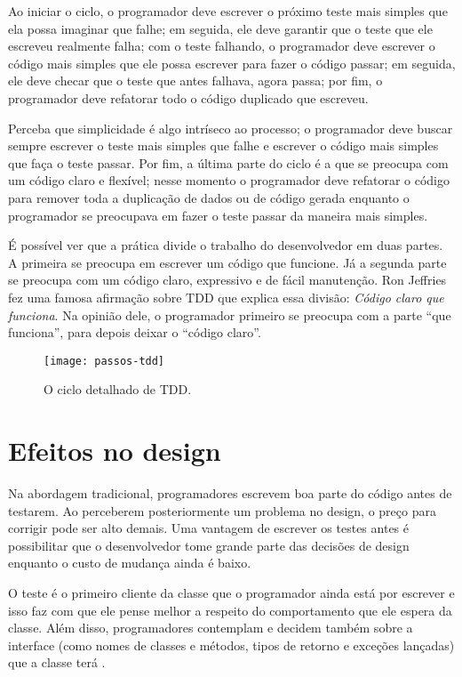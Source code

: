 Ao iniciar o ciclo, o programador deve escrever o próximo teste mais simples que
ela possa imaginar que falhe; em seguida, ele deve garantir que o teste que ele
escreveu realmente falha; com o teste falhando, o programador deve escrever o
código mais simples que ele possa escrever para fazer o código passar; em
seguida, ele deve checar que o teste que antes falhava, agora passa; por fim, o
programador deve refatorar todo o código duplicado que escreveu.

Perceba que simplicidade é algo intríseco ao processo; o programador deve buscar
sempre escrever o teste mais simples que falhe e escrever o código mais simples
que faça o teste passar. Por fim, a última parte do ciclo é a que se preocupa
com um código claro e flexível; nesse momento o programador deve refatorar o
código para remover toda a duplicação de dados ou de código gerada enquanto o
programador se preocupava em fazer o teste passar da maneira mais simples.

É possível ver que a prática divide o trabalho do desenvolvedor em duas partes.
A primeira se preocupa em escrever um código que funcione. Já a segunda parte
se preocupa com um código claro, expressivo e de fácil manutenção. Ron Jeffries
fez uma famosa afirmação sobre TDD que explica essa divisão: \textit{Código
claro que funciona}. Na opinião dele, o programador primeiro se preocupa com a
parte ``que funciona'', para depois deixar o ``código claro''.

\begin{figure}
  \centering
  \texttt{[image: passos-tdd]}
  \caption{O ciclo detalhado de TDD.}
  \label{fig:passos-tdd}
\end{figure}

\section{Efeitos no design}

Na abordagem tradicional, programadores escrevem boa parte do código antes de
testarem. Ao perceberem posteriormente um problema no design, o preço para
corrigir pode ser alto demais. Uma vantagem de escrever os testes antes é
possibilitar que o desenvolvedor tome grande parte das decisões de design
enquanto o custo de mudança ainda é baixo.

O teste é o primeiro cliente da
classe que o programador ainda está por escrever e isso faz com que ele pense
melhor a respeito do comportamento que ele espera da classe. Além disso,
programadores contemplam e decidem também sobre a interface (como nomes de
classes e métodos, tipos de retorno e exceções lançadas) que a classe terá
\cite{janzen-saiedian}.

